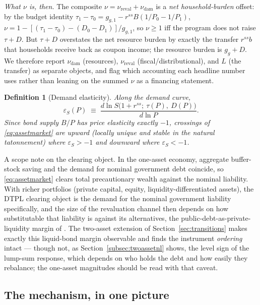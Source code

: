 \documentclass[12pt]{article}
\newtheorem{definition}{Definition}
\newcommand{\Sfun}{S}
\begin{document}
\emph{What $\nu$ is, then.} The composite $\nu=\nu_{\mathrm{reval}}+\nu_{\mathrm{dam}}$
is a \emph{net household-burden} offset: by the budget identity
$\tau_1-\tau_0=g_{g,1}-r^{ss}B(1/P_0-1/P_1)$,
$\nu=1-[(\tau_1-\tau_0)-(D_0-D_1)]/g_{g,1}$, so $\nu\ge1$ iff the program does
not raise $\tau+D$. But $\tau+D$ overstates the net resource burden by
exactly the transfer $r^{ss}b$ that households receive back as coupon income;
the resource burden is $g_g+D$. We therefore report $\nu_{\mathrm{dam}}$
(resources), $\nu_{\mathrm{reval}}$ (fiscal/distributional), and $L$ (the
transfer) as separate objects, and flag which accounting each headline number
uses rather than leaning on the summed $\nu$ as a financing statement.

\begin{definition}[Demand elasticity]\label{def:elasticity}
Along the demand curve,
\[
\varepsilon_S(P) \;\equiv\;
\frac{d\ln \Sfun\big(1+r^{ss};\ \tau(P),\ D(P)\big)}{d\ln P}.
\]
Since bond supply $B/P$ has price
elasticity exactly $-1$, crossings of \eqref{eq:assetmarket} are
upward (locally unique and stable in the natural tatonnement) where
$\varepsilon_S>-1$ and downward where $\varepsilon_S<-1$.
\end{definition}

A scope note on the clearing object. In the one-asset economy, aggregate
buffer-stock saving and the demand for nominal government debt coincide,
so \eqref{eq:assetmarket} clears total precautionary wealth against
the nominal liability. With richer portfolios (private capital, equity,
liquidity-differentiated assets), the DTPL clearing object is the demand
for the nominal government liability specifically, and the size of
the revaluation channel then depends on how substitutable that liability
is against its alternatives, the public-debt-as-private-liquidity margin
of \citet{woodford1990}. The two-asset extension of
Section~\ref{sec:transitions} makes exactly this liquid-bond margin
observable and finds the instrument \emph{ordering} intact --- though not,
as Section~\ref{subsec:twoassetnl} shows, the level sign of the lump-sum
response, which depends on who holds the debt and how easily they
rebalance; the one-asset magnitudes should be read with that caveat.

\subsection{The mechanism, in one picture}\label{subsec:mechanism}
\end{document}
